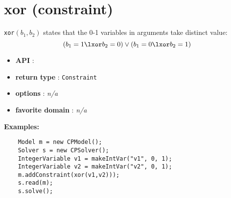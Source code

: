 \label{xor}
\hypertarget{xor}{}

\section{xor (constraint)}\label{xor:xorconstraint}\hypertarget{xor:xorconstraint}{}
\begin{notedef}
    \texttt{xor}$(b_1,b_2)$ states that the 0-1 variables in arguments take distinct value:
$$ (b_1=1 \lxor b_2=0) \lor (b_1=0 \lxor b_2=1)$$
\end{notedef}

\begin{itemize}
    \item \textbf{API} : 
	\item \textbf{return type} : \texttt{Constraint}
	\item \textbf{options} : \emph{n/a}
	\item \textbf{favorite domain} : \emph{n/a}
\end{itemize}

\textbf{Examples:}
\begin{lstlisting}
	Model m = new CPModel();
	Solver s = new CPSolver();
	IntegerVariable v1 = makeIntVar("v1", 0, 1);
	IntegerVariable v2 = makeIntVar("v2", 0, 1);
	m.addConstraint(xor(v1,v2)));
	s.read(m);
	s.solve();
\end{lstlisting}
